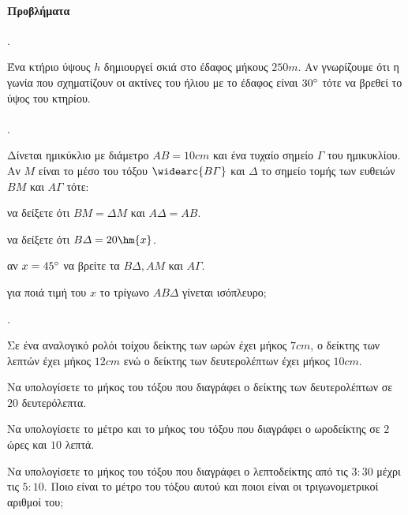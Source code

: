 \documentclass[11pt,a4paper,twocolumn]{article}
\newcounter{askhsh}
\newcommand{\askhsh}{\large\theaskhsh.\ \addtocounter{askhsh}{1}}
\newcommand{\roloi}[4][]{
\draw[line width=.5mm,#1] (0,0) circle(2);
\foreach \n in {1,2,...,12}{
\tkzDefPoint(30*\n-90:2){A_\n}
\node at (-30*\n+90:1.65){\n};}
\draw[plm,,#1] (0,0)--(90-30*#2-0.5*#3:1);
\draw[pl,#1] (0,0)--(90-6*#3-0.1*#4:1.5);
\draw[#1](0,0)--(90-6*#4:1.2);
\tkzDrawPoint[fill=#1,color=#1](0,0)
\foreach \s in {1,2,...,12}{
\draw[#1](90-30*\s:1.85)--(90-30*\s:2);}
\foreach \t in {1,2,...,60}{
\draw[#1](90-6*\t:1.93)--(90-6*\t:2);}}
\begin{document}
\paragraph{Προβλήματα}
\askhsh Ένα κτήριο ύψους $ h $ δημιουργεί σκιά στο έδαφος μήκους $ 250m $. Αν γνωρίζουμε ότι η γωνία που σχηματίζουν οι ακτίνες του ήλιου με το έδαφος είναι $ 30\degree $ τότε να βρεθεί το ύψος του κτηρίου.\\\\
\askhsh Δίνεται ημικύκλιο με διάμετρο $ AB=10cm $ και ένα τυχαίο σημείο $ \varGamma $ του ημικυκλίου. Αν $ M $ είναι το μέσο του τόξου $ \widearc{B\varGamma} $ και $ \varDelta $ το σημείο τομής των ευθειών $ BM $ και $ A\varGamma $ τότε:
\begin{center}
\end{center}
\begin{alist}
\item να δείξετε ότι $ BM=\varDelta M $ και $ A\varDelta=AB $.
\item να δείξετε ότι $ B\varDelta=20\hm{x} $.
\item αν $ x=45\degree $ να βρείτε τα $ B\varDelta,AM $ και $ A\varGamma $.
\item για ποιά τιμή του $ x $ το τρίγωνο $ AB\varDelta $ γίνεται ισόπλευρο;
\end{alist}
\askhsh Σε ένα αναλογικό ρολόι τοίχου δείκτης των ωρών έχει μήκος $ 7cm $, ο δείκτης των λεπτών έχει μήκος $ 12cm $ ενώ ο δείκτης των δευτερολέπτων έχει μήκος $ 10cm $.
\begin{center}
\end{center}
\begin{alist}
\item Να υπολογίσετε το μήκος του τόξου που διαγράφει ο δείκτης των δευτερολέπτων σε $ 20 $ δευτερόλεπτα.
\item Να υπολογίσετε το μέτρο και το μήκος του τόξου που διαγράφει ο ωροδείκτης σε $ 2 $ ώρες και $ 10 $ λεπτά.
\item Να υπολογίσετε το μήκος του τόξου που διαγράφει ο λεπτοδείκτης από τις $ 3:30 $ μέχρι τις $ 5:10 $. Ποιο είναι το μέτρο του τόξου αυτού και ποιοι είναι οι τριγωνομετρικοί αριθμοί του;
\end{alist}
\end{document}
